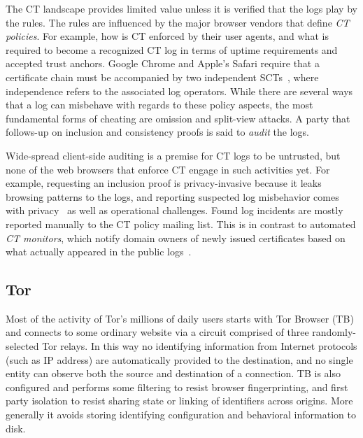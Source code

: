 The CT landscape provides limited value unless it is verified that the logs
play by the rules.  The rules are influenced by the major browser vendors that
define \emph{CT policies}.  For example, how is CT enforced by their user
agents, and what is required to become a recognized CT log in terms of uptime
requirements and accepted trust anchors.  Google Chrome and Apple's Safari
require that a certificate chain must be accompanied by two independent
SCTs~\cite{chrome-policy,safari-policy}, where independence refers to the
associated log operators.  While there are several ways that a log can misbehave
with regards to these policy aspects, the most fundamental forms of cheating are
omission and split-view attacks.  A party that follows-up on inclusion and
consistency proofs is said to \emph{audit} the logs.

Wide-spread client-side auditing is a premise for CT logs to be untrusted, but
none of the web browsers that enforce CT engage in such activities yet.  For
example, requesting an inclusion proof is privacy-invasive because it leaks
browsing patterns to the logs, and reporting suspected log misbehavior comes
with privacy~\cite{ct-with-privacy} as well as operational challenges.
Found log incidents are mostly reported manually to the CT policy mailing list.
This is in contrast to automated \emph{CT monitors}, which notify domain owners
of newly issued certificates based on what actually appeared in the public
logs~\cite{lwm,ct-monitors}.


\subsection{Tor} \label{sec:background:tor}

Most of the activity of Tor's millions of daily users starts with Tor Browser (TB)
and connects to some ordinary website via a circuit comprised of three
randomly-selected Tor relays. In this way no identifying information from
Internet protocols (such as IP address) are automatically provided to the
destination, and no single entity can observe both the source and destination of
a connection. TB is also configured and performs some filtering to resist
browser fingerprinting, and first party isolation to resist sharing state or
linking of identifiers across origins. More generally it avoids storing
identifying configuration and behavioral information to disk.

